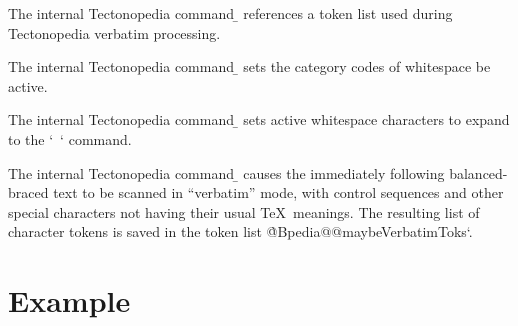 
The internal Tectonopedia command \b{\string\pedia@maybeVerbatimToks} references
a token list used during Tectonopedia verbatim processing.


\tduxEmit %



The internal Tectonopedia command \b{\string\pedia@makeActiveWhitespace} sets
the category codes of whitespace be active.


\tduxEmit %



The internal Tectonopedia command \b{\string\pedia@defineActiveWhitespace} sets
active whitespace characters to expand to the \tex`\ ` command.


\tduxEmit %



The internal Tectonopedia command \b{\string\pediaScanVerbatim} causes the
immediately following balanced-braced text to be scanned in “verbatim” mode,
with control sequences and other special characters not having their usual \TeX\
meanings. The resulting list of character tokens is saved in the token list
\`@Bpedia@@maybeVerbatimToks`.

\section*{Example}

\begin{texdisp}
\pediaScanVerbatim{\hello$_$}
\makeatletter
\the\pedia@maybeVerbatimToks %
\makeatother
\end{texdisp}


